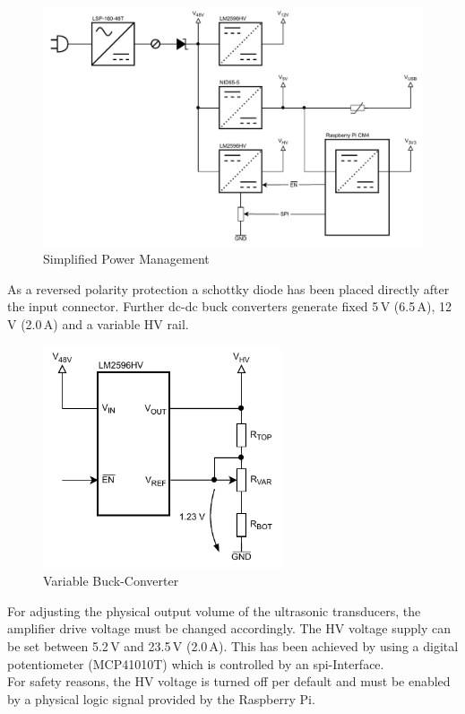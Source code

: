 \begin{figure}[h!]
	\centering
	\includegraphics[width=\textwidth]{images/4_Design/Hardware/Power Supply Overview.pdf}
	\vspace{-0.6cm}
    \caption{Simplified Power Management}
    \label{fig:simplified-power}
\end{figure}

As a reversed polarity protection a schottky diode has been placed directly after the input connector. Further \acrshort{dc}-\acrshort{dc} buck converters generate fixed 5\,V (6.5\,A), 12\,V (2.0\,A) and a variable HV rail.


\bigskip
\begin{figure}
    \vspace{-0.6cm}
    \includegraphics[width=7cm]{images/4_Design/Hardware/Variable Buck-Converter.pdf}
    \vspace{-0.6cm}
    \caption{Variable Buck-Converter}
    \label{fig:variable-buck-converter}
\end{figure} 
For adjusting the physical output volume of the ultrasonic transducers, the amplifier drive voltage must be changed accordingly. The HV voltage supply can be set between 5.2\,V and 23.5\,V (2.0\,A). This has been achieved by using a digital potentiometer (MCP41010T) which is controlled by an \acrshort{spi}-Interface.\\
For safety reasons, the HV voltage is turned off per default and must be enabled by a physical logic signal provided by the Raspberry Pi.
\clearpage

